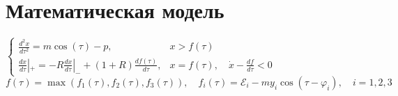 \section{Математическая модель}

\Large
{
$
\begin{cases}
\frac{{d^2 x}}{{d \tau^2}} = m \cos(\tau) - p, & x > f(\tau) \\[2mm]
\frac{{dx}}{{d\tau}}|_+ = -R \frac{{dx}}{{d\tau}}|_- + (1 + R) \frac{{df(\tau)}}{{d\tau}}, & x = f(\tau), \quad \dot{x} - \frac{{df}}{{d\tau}} < 0
\end{cases}
$
}
\\[8mm]
\large
{
$
f(\tau) = \max(f_1(\tau), f_2(\tau), f_3(\tau)),\quad f_i(\tau) = \mathcal{E}_i - m y_i \cos(\tau - \varphi_i),\quad i={1,2,3}
$
}